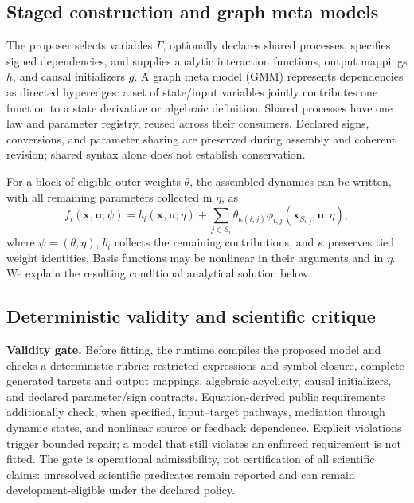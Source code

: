 \subsection{Staged construction and graph meta models}

The proposer selects variables $\Gamma$, optionally declares shared
processes, specifies signed dependencies, and supplies analytic
interaction functions, output mappings $h$, and causal initializers $g$.
A graph meta model (GMM) represents dependencies as directed hyperedges:
a set of state/input variables jointly contributes one function to a
state derivative or algebraic definition. Shared processes have one
law and parameter registry, reused across their consumers. Declared
signs, conversions, and parameter sharing are preserved during assembly
and coherent revision; shared syntax alone does not establish conservation.

For a block of eligible outer weights $\theta$, the assembled dynamics
can be written, with all remaining parameters collected in $\eta$, as
\begin{equation}
 f_i(\mathbf x,\mathbf u;\psi)
 =b_i(\mathbf x,\mathbf u;\eta)
 +\sum_{j\in\mathcal E_i}\theta_{\kappa(i,j)}
 \phi_{i,j}(\mathbf x_{S_{i,j}},\mathbf u;\eta),
 \label{eq:af-gmm}
\end{equation}
where $\psi=(\theta,\eta)$, $b_i$ collects the remaining contributions,
and $\kappa$ preserves tied weight identities. Basis functions may be
nonlinear in their arguments and in $\eta$. We explain the resulting
conditional analytical solution below.

\subsection{Deterministic validity and scientific critique}

\textbf{Validity gate.} Before fitting, the runtime compiles the proposed
model and checks a deterministic rubric: restricted expressions and
symbol closure, complete generated targets and output mappings,
algebraic acyclicity, causal initializers, and declared parameter/sign
contracts. Equation-derived public requirements additionally check, when
specified, input--target pathways, mediation through dynamic states,
and nonlinear source or feedback dependence. Explicit violations trigger
bounded repair; a model that still violates an enforced requirement is
not fitted. The gate is operational admissibility, not certification of
all scientific claims: unresolved scientific predicates remain reported
and can remain development-eligible under the declared policy.

